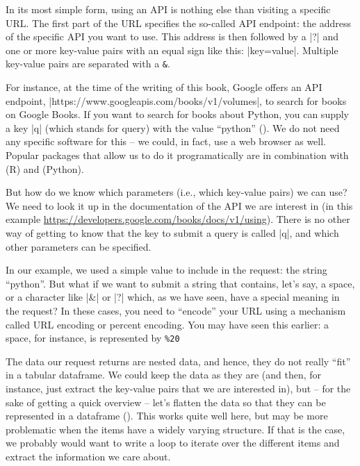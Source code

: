 In its most simple form, using an API is nothing else than visiting
a specific URL. The first part of the URL specifies the so-called
API endpoint: the address of the specific API you want to use. This
address is then followed by a |?| and one or more key-value pairs with an
equal sign like this: |key=value|. Multiple key-value pairs are
separated with a \texttt{\&}.

For instance, at the time of the writing of this book, Google offers
an API endpoint, |https://www.googleapis.com/books/v1/volumes|, to search for books on Google Books.
If you want to search for books about Python, you can supply a key |q| (which stands for query) with
the value ``python'' (). We do not need any specific
software for this -- we could, in fact, use a web browser as well.
Popular packages that allow us to do it programatically are 
in combination with  (R) and  (Python).

But how do we know which parameters (i.e., which key-value pairs) we can use?
We need to look it up in the documentation of the API we are
interest in (in this example \url{https://developers.google.com/books/docs/v1/using}).
There is no other way of getting to know that the key to submit a query
is called |q|, and which other parameters can be specified.

\begin{feature}
  In our example, we used a simple value to include in the request:
  the string ``python''.  But what if we want to submit a string that
  contains, let's say, a space, or a character like |&| or |?| which,
  as we have seen, have a special meaning in the request? In these
  cases, you need to ``encode'' your URL using a mechanism called URL
  encoding or percent encoding. You may have seen this earlier: a
  space, for instance, is represented by \texttt{\%20}
\end{feature}


The data our request returns are nested data, and hence, they do not
really ``fit'' in a tabular dataframe. We could keep the data as they
are (and then, for instance, just extract the key-value pairs that we
are interested in), but -- for the sake of getting a quick overview --
let's flatten the data so that they can be represented in a dataframe
(). This works quite well here, but may be more
problematic when the items have a widely varying structure. If that
is the case, we probably would want to write a loop to iterate
over the different items and extract the information we care about.

